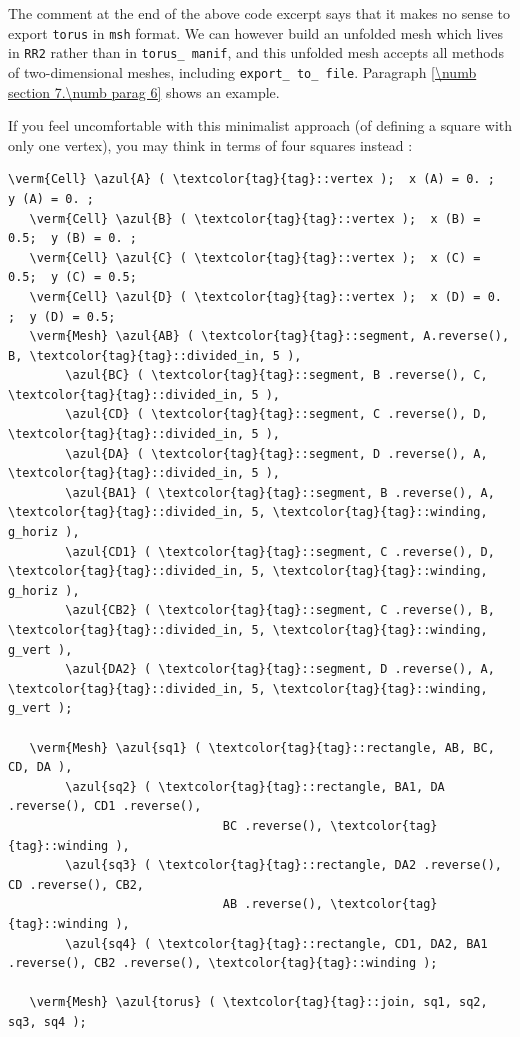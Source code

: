 The comment at the end of the above code excerpt says that it makes no sense to export
{\small\tt torus} in {\small\tt msh} format.
We can however build an unfolded mesh which lives in {\small\tt RR2} rather than in
{\small\tt torus\_\,manif}, and this unfolded mesh accepts all methods of two-dimensional
meshes, including {\small\tt export\_\,to\_\,file}.
Paragraph \ref{\numb section 7.\numb parag 6} shows an example.

If you feel uncomfortable with this minimalist approach (of defining a square with only one
vertex), you may think in terms of four squares instead :

\begin{Verbatim}[commandchars=\\\{\},formatcom=\small\tt,
   baselinestretch=0.94,framesep=2mm                      ]
   \verm{Cell} \azul{A} ( \textcolor{tag}{tag}::vertex );  x (A) = 0. ;  y (A) = 0. ;
   \verm{Cell} \azul{B} ( \textcolor{tag}{tag}::vertex );  x (B) = 0.5;  y (B) = 0. ;
   \verm{Cell} \azul{C} ( \textcolor{tag}{tag}::vertex );  x (C) = 0.5;  y (C) = 0.5;
   \verm{Cell} \azul{D} ( \textcolor{tag}{tag}::vertex );  x (D) = 0. ;  y (D) = 0.5;
   \verm{Mesh} \azul{AB} ( \textcolor{tag}{tag}::segment, A.reverse(), B, \textcolor{tag}{tag}::divided_in, 5 ),
        \azul{BC} ( \textcolor{tag}{tag}::segment, B .reverse(), C, \textcolor{tag}{tag}::divided_in, 5 ),
        \azul{CD} ( \textcolor{tag}{tag}::segment, C .reverse(), D, \textcolor{tag}{tag}::divided_in, 5 ),
        \azul{DA} ( \textcolor{tag}{tag}::segment, D .reverse(), A, \textcolor{tag}{tag}::divided_in, 5 ),
        \azul{BA1} ( \textcolor{tag}{tag}::segment, B .reverse(), A, \textcolor{tag}{tag}::divided_in, 5, \textcolor{tag}{tag}::winding, g_horiz ),
        \azul{CD1} ( \textcolor{tag}{tag}::segment, C .reverse(), D, \textcolor{tag}{tag}::divided_in, 5, \textcolor{tag}{tag}::winding, g_horiz ),
        \azul{CB2} ( \textcolor{tag}{tag}::segment, C .reverse(), B, \textcolor{tag}{tag}::divided_in, 5, \textcolor{tag}{tag}::winding, g_vert ),
        \azul{DA2} ( \textcolor{tag}{tag}::segment, D .reverse(), A, \textcolor{tag}{tag}::divided_in, 5, \textcolor{tag}{tag}::winding, g_vert );

   \verm{Mesh} \azul{sq1} ( \textcolor{tag}{tag}::rectangle, AB, BC, CD, DA ),
        \azul{sq2} ( \textcolor{tag}{tag}::rectangle, BA1, DA .reverse(), CD1 .reverse(),
                              BC .reverse(), \textcolor{tag}{tag}::winding ),
        \azul{sq3} ( \textcolor{tag}{tag}::rectangle, DA2 .reverse(), CD .reverse(), CB2,
                              AB .reverse(), \textcolor{tag}{tag}::winding ),
        \azul{sq4} ( \textcolor{tag}{tag}::rectangle, CD1, DA2, BA1 .reverse(), CB2 .reverse(), \textcolor{tag}{tag}::winding );
	
   \verm{Mesh} \azul{torus} ( \textcolor{tag}{tag}::join, sq1, sq2, sq3, sq4 );
\end{Verbatim}


